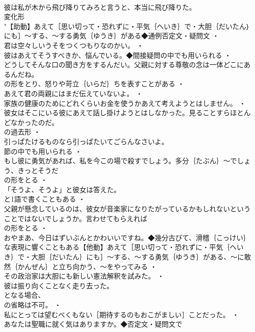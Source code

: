 \documentclass[8pt]{extreport}
\begin{document}
\begin{CJK}{UTF8}{min}
\\	彼は私が木から飛び降りてみろと言うと、本当に飛び降りた。
\\	変化形 
\\	"【助動】あえて［思い切って・恐れずに・平気｛へいき｝で・大胆｛だいたん｝にも］～する、～する勇気｛ゆうき｝がある◆通例否定文・疑問文 ・
\\	君は空々しいうそをつくつもりなのかい。 ・
\\	彼はあえてそうすべきか、悩んでいる。◆間接疑問の中でも用いられる ・
\\	どうしてそんな口の聞き方をするんだい。父親に対する尊敬の念は一体どこにあるんだね。
\\	の形をとり、怒りや苛立｛いらだ｝ちを表すことがある ・
\\	あえて君の両親にはまだ伝えていないよ。 ・
\\	家族の健康のためにどれくらいお金を使うかあえて考えようとはしません。 ・
\\	彼女はそこにいる彼にあえて話し掛けようとはしなかった。見ることすらほとんどなかったのだ。
\\	の過去形 ・
\\	引っぱたけるものなら引っぱたいてごらんなさいよ。
\\	節の中でも用いられる ・
\\	もし彼に勇気があれば、私を今この場で殺すでしょう。多分｛たぶん｝～でしょう、きっとそうだ
\\	の形をとる ・
\\	「そうよ、そうよ」と彼女は答えた。
\\	と1語で書くこともある ・
\\	父親が懸念しているのは、彼女が音楽家になりたがっているかもしれないということではないでしょうか。言わせてもらえれば
\\	の形をとる ・
\\	おやまあ、今日はずいぶんとかわいいですね。◆幾分古びて、滑稽｛こっけい｝な表現に響くこともある【他動】あえて［思い切って・恐れずに・平気｛へいき｝で・大胆｛だいたん｝にも］～する、～する勇気｛ゆうき｝がある、～に敢然｛かんぜん｝と立ち向かう、～をやってみる ・
\\	その政治家は大胆にも新しい憲法解釈を試みた。 ・
\\	彼は振り向くことなく走り去った。
\\	となる場合、
\\	の省略は不可。 ・
\\	私にとっては望むべくもない［期待するのもおこがましい］ことだった。 ・
\\	あなたは聖職に就く気はありますか。◆否定文・疑問文で

\end{CJK}
\end{document}
